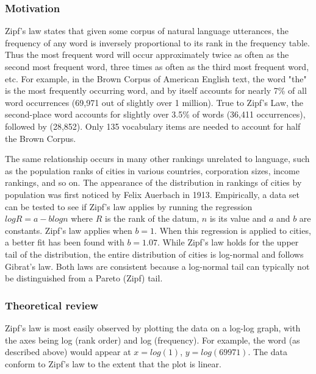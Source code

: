     \subsubsection{Motivation}
    
      Zipf's law states that given some corpus of natural language utterances, the frequency of any word is inversely proportional to its rank in the frequency table. Thus the most frequent word will occur approximately twice as often as the second most frequent word, three times as often as the third most frequent word, etc. For example, in the Brown Corpus of American English text, the word "the" is the most frequently occurring word, and by itself accounts for nearly 7\% of all word occurrences (69,971 out of slightly over 1 million). True to Zipf's Law, the second-place word  accounts for slightly over 3.5\% of words (36,411 occurrences), followed by  (28,852). Only 135 vocabulary items are needed to account for half the Brown Corpus.
  
      The same relationship occurs in many other rankings unrelated to language, such as the population ranks of cities in various countries, corporation sizes, income rankings, and so on. The appearance of the distribution in rankings of cities by population was first noticed by Felix Auerbach in 1913.\cite{Auerbach1913} Empirically, a data set can be tested to see if Zipf's law applies by running the regression $log R = a - b log n$ where $R$ is the rank of the datum, $n$ is its value and $a$ and $b$ are constants. Zipf's law applies when $b = 1$. When this regression is applied to cities, a better fit has been found with $b = 1.07$. While Zipf's law holds for the upper tail of the distribution, the entire distribution of cities is log-normal and follows Gibrat's law.\cite{Eeckhout2004} Both laws are consistent because a log-normal tail can typically not be distinguished from a Pareto (Zipf) tail.
    
    \subsubsection{Theoretical review}

      Zipf's law is most easily observed by plotting the data on a log-log graph, with the axes being log (rank order) and log (frequency). For example, the word  (as described above) would appear at $x = log(1)$, $y = log(69971)$. The data conform to Zipf's law to the extent that the plot is linear.
      
